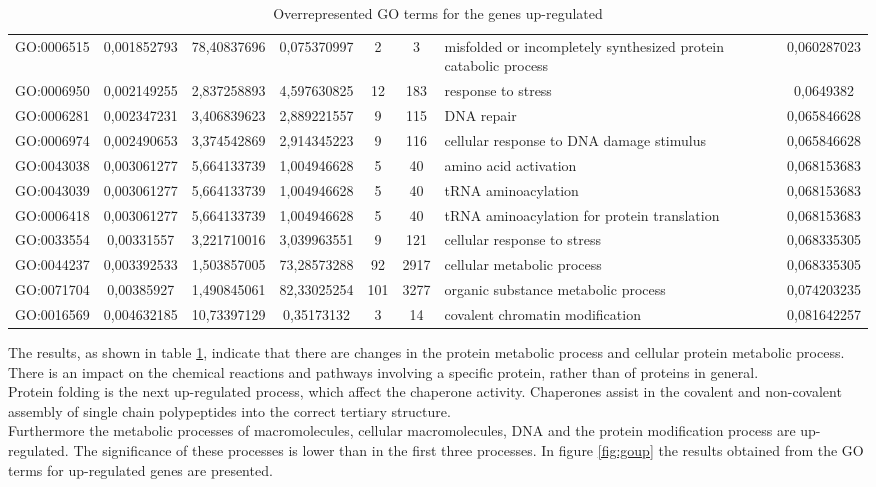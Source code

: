 \documentclass[12pt, a4paper]{report}
\begin{document}
\begin{table}[H]
\begin{tabular}{c|c|c|c|c|c|p{}|c}
GO:0006515&	0,001852793&	78,40837696&	0,075370997&	2&	3&	misfolded or incompletely synthesized protein catabolic process&	0,060287023\\
GO:0006950&	0,002149255&	2,837258893&	4,597630825&	12&	183&	response to stress&	0,0649382\\
GO:0006281&	0,002347231&	3,406839623&	2,889221557&	9&	115&	DNA repair&	0,065846628\\
GO:0006974&	0,002490653&	3,374542869&	2,914345223&	9&	116&	cellular response to DNA damage stimulus&	0,065846628\\
GO:0043038&	0,003061277&	5,664133739&	1,004946628&	5&	40&	amino acid activation&	0,068153683\\
GO:0043039&	0,003061277&	5,664133739&	1,004946628&	5&	40&	tRNA aminoacylation&	0,068153683\\
GO:0006418&	0,003061277&	5,664133739&	1,004946628&	5&	40&	tRNA aminoacylation for protein translation&	0,068153683\\
GO:0033554&	0,00331557&	3,221710016&	3,039963551&	9&	121&	cellular response to stress&	0,068335305\\
GO:0044237&	0,003392533&	1,503857005&	73,28573288&	92&	2917&	cellular metabolic process&	0,068335305\\
GO:0071704&	0,00385927&	1,490845061&	82,33025254&	101&	3277&	organic substance metabolic process&	0,074203235\\
GO:0016569&	0,004632185&	10,73397129&	0,35173132&	3&	14&	covalent chromatin modification&	0,081642257\\
\hline
\end{tabular}
\caption{Overrepresented GO terms for the genes up-regulated}
\label{tab:GOup}
\end{table}

The results, as shown in table \ref{tab:GOup}, indicate that there are changes in the protein metabolic process and cellular protein metabolic process. There is an impact on the chemical reactions and pathways involving a specific protein, rather than of proteins in general. \\
Protein folding is the next up-regulated process, which affect the chaperone activity. Chaperones assist in the covalent and non-covalent assembly of single chain polypeptides into the correct tertiary structure. \\
Furthermore the metabolic processes of macromolecules, cellular macromolecules, DNA and the protein modification process are up-regulated. The significance of these processes is lower than in the first three processes. In figure \ref{fig:goup} the results obtained from the GO terms for up-regulated genes are presented. 
\end{document}
